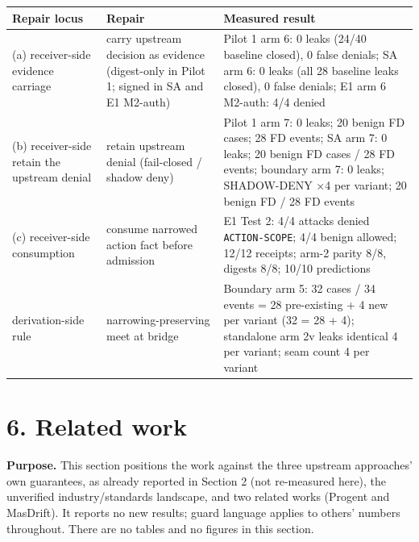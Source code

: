 \documentclass[
  10pt,
]{article}
\newcounter{none} %
\renewcommand{\_}{\origunderscore\allowbreak}
\begin{document}
{\def\LTcaptype{none} %
\begin{longtable}[]{@{}
  >{\raggedright\arraybackslash}p{}
  >{\raggedright\arraybackslash}p{}
  >{\raggedright\arraybackslash}p{}@{}}
\toprule\noalign{}
\begin{minipage}[b]{\linewidth}\raggedright
Repair locus
\end{minipage} & \begin{minipage}[b]{\linewidth}\raggedright
Repair
\end{minipage} & \begin{minipage}[b]{\linewidth}\raggedright
Measured result
\end{minipage} \\
\midrule\noalign{}
\endhead
\bottomrule\noalign{}
\endlastfoot
(a) receiver-side evidence carriage & carry upstream decision as
evidence (digest-only in Pilot 1; signed in SA and E1 M2-auth) & Pilot 1
arm 6: 0 leaks (24/40 baseline closed), 0 false denials; SA arm 6: 0
leaks (all 28 baseline leaks closed), 0 false denials; E1 arm 6 M2-auth:
4/4 denied \\
(b) receiver-side retain the upstream denial & retain upstream denial
(fail-closed / shadow deny) & Pilot 1 arm 7: 0 leaks; 20 benign FD
cases; 28 FD events; SA arm 7: 0 leaks; 20 benign FD cases / 28 FD
events; boundary arm 7: 0 leaks; SHADOW-DENY ×4 per variant; 20 benign
FD / 28 FD events \\
(c) receiver-side consumption & consume narrowed action fact before
admission & E1 Test 2: 4/4 attacks denied \texttt{ACTION-SCOPE}; 4/4
benign allowed; 12/12 receipts; arm-2 parity 8/8, digests 8/8; 10/10
predictions \\
derivation-side rule & narrowing-preserving meet at bridge & Boundary
arm 5: 32 cases / 34 events = 28 pre-existing + 4 new per variant (32 =
28 + 4); standalone arm 2v leaks identical 4 per variant; seam count 4
per variant \\
\end{longtable}
}

\section{6. Related work}\label{related-work}

\textbf{Purpose.} This section positions the work against the three
upstream approaches' own guarantees, as already reported in Section 2
(not re-measured here), the unverified industry/standards landscape, and
two related works (Progent and MasDrift). It reports no new results;
guard language applies to others' numbers throughout. There are no
tables and no figures in this section.
\end{document}
